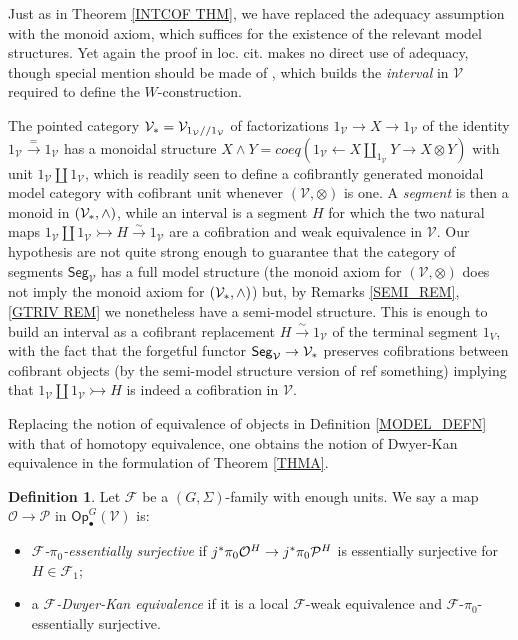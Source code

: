 \documentclass[a4paper,10pt
,draft
]{article}%
\numberwithin{equation}{section}
\numberwithin{figure}{section}
\theoremstyle{definition} %
\newtheorem{definition}[equation]{Definition}%
\newcommand{\Op}{\mathsf{Op}}%
\newcommand{\F}{\ensuremath{\mathcal F}}
\newcommand{\V}{\ensuremath{\mathcal V}}
\renewcommand{\O}{\ensuremath{\mathcal O}}
\renewcommand{\P}{\ensuremath{\mathcal P}}
\newcommand{\1}{\ensuremath{\mathbbm 1}}%
\begin{document}
Just as in Theorem \ref{INTCOF THM},
we have replaced the adequacy assumption \cite[Def. 1.1]{BM13}
with the monoid axiom, which suffices for the existence of the relevant model structures. 
Yet again the proof in loc. cit. makes no direct use of adequacy, 
though special mention should be made of \cite[Lemma 2.23]{BM13}, 
which builds the \emph{interval} \cite[Def. 4.1]{BM06} in $\V$
required to define the $W$-construction.

The pointed category $\V_{\**}=\V_{1_{\V}//1_{\V}}$
of factorizations
$1_{\V} \to X \to 1_{\V}$
of the identity
$1_{\V} \xrightarrow{=} 1_{\V}$
has a monoidal structure
$X \wedge Y  = coeq \left(1_{\V} \leftarrow X \amalg_{1_{\V}} Y \to X \otimes Y\right)$ with unit $1_{\V} \amalg 1_{\V}$,
which is readily seen to define a cofibrantly generated monoidal model category with cofibrant unit whenever $(\V,\otimes)$ is one.
A \emph{segment} \cite[Def. 4.1]{BM06} is then a monoid
in $(\V_{\**},\wedge)$,
while an interval is a segment $H$ for which the two natural maps
$1_{\V} \amalg 1_{\V} \rightarrowtail H \xrightarrow{\sim} 1_{\V}$
are a cofibration and weak equivalence in $\V$.
Our hypothesis are not quite strong enough 
to guarantee that the category of segments $\mathsf{Seg}_{\V}$
has a full model structure 
(the monoid axiom for $(\V,\otimes)$ does not imply the monoid axiom for $(\V_{\**},\wedge)$) but,
by Remarks \ref{SEMI_REM}, \ref{GTRIV REM}
we nonetheless have a semi-model structure. This is enough to build an interval as a cofibrant replacement
$H \xrightarrow{\sim} 1_{\V}$
of the terminal segment $1_{V}$, with the fact that the forgetful functor
$\mathsf{Seg}_{\V} \to \V_{\**}$
preserves cofibrations between cofibrant objects 
(by the semi-model structure version of \cite[Thm. \ref{OC-THMII}]{BP_FCOP} {\color{red} ref something})
implying that
$1_{\V} \amalg 1_{\V} \rightarrowtail H$
is indeed a cofibration in $\V$.


\vskip 10pt



Replacing the notion of equivalence of objects
in Definition \ref{MODEL_DEFN}
with that of homotopy equivalence, 
one obtains the notion of Dwyer-Kan equivalence
in the formulation of Theorem \ref{THMA}.


\begin{definition}\label{DKEQUIV_DEF}
Let $\F$ be a $(G,\Sigma)$-family with enough units.
We say a map $\O \to \P$ in $\Op^G_\bullet(\V)$ is:
\begin{itemize}
\item \textit{$\F$-$\pi_0$-essentially surjective} if
	$j^{\**}\pi_0 \O^H \to j^{\**}\pi_0 \P^H$
	is essentially surjective for $H \in \F_1$;
\item a \textit{$\F$-Dwyer-Kan equivalence} if
	it is a local $\F$-weak equivalence and $\F$-$\pi_0$-essentially
	surjective.
\end{itemize}
\end{definition}
\end{document}
